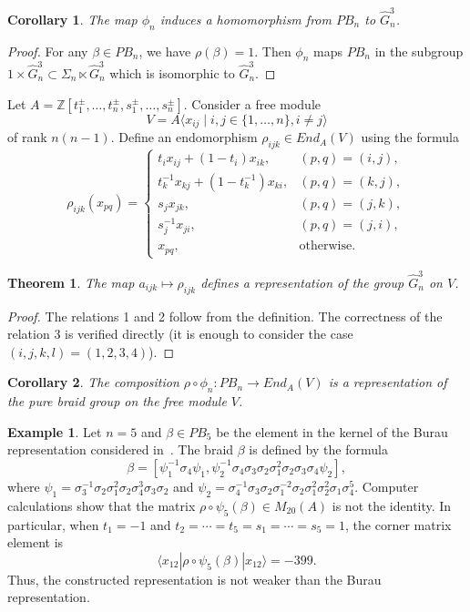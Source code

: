 \documentclass{article}
\newtheorem{theorem}{Theorem}
\newtheorem{corollary}{Corollary}
\theoremstyle{definition}
\newtheorem{example}{Example}
\newcommand{\Z}{{\mathbb Z}}
\begin{document}
\begin{corollary}
    The map  $\phi_n$ induces a homomorphism from $PB_n$ to $\hat G^3_n$.
\end{corollary}
\begin{proof}
 For any $\beta\in PB_n$, we have $\rho(\beta)=1$. Then $\phi_n$ maps $PB_n$ in the subgroup $1\times \hat G^3_n\subset \Sigma_n\ltimes \hat G^3_n$ which is isomorphic to $\hat G^3_n$.
\end{proof}

Let $A=\Z[t_1^\pm,\dots,t_n^\pm,s_1^\pm,\dots,s_n^\pm]$. Consider a free module 
\[
V=A\langle x_{ij}\mid i,j\in\{1,\dots,n\}, i\ne j\rangle
\]
of rank $n(n-1)$. Define an endomorphism $\rho_{ijk}\in End_A(V)$ using the formula
\[
\rho_{ijk}(x_{pq})=\left\{\begin{array}{cl}
    t_ix_{ij}+(1-t_i)x_{ik}, & (p,q)=(i,j), \\
    t_k^{-1}x_{kj}+(1-t_k^{-1})x_{ki}, & (p,q)=(k,j), \\
    s_j x_{jk}, & (p,q)=(j,k),\\
    s_j^{-1} x_{ji}, & (p,q)=(j,i),\\
    x_{pq}, & \mbox{otherwise}.
\end{array}\right.
\]

\begin{theorem}
    The map $a_{ijk}\mapsto \rho_{ijk}$ defines a representation of the group $\hat G^3_n$ on $V$.
\end{theorem}
\begin{proof}
    The relations 1 and 2 follow from the definition. The correctness of the relation 3 is verified directly (it is enough to consider the case $(i,j,k,l)=(1,2,3,4)$).
\end{proof}

\begin{corollary}
    The composition $\rho\circ\phi_n\colon PB_n\to End_A(V)$ is a representation of the pure braid group on the free module $V$.
\end{corollary}

\begin{example}
Let $n=5$ and $\beta\in PB_5$ be the element in the kernel of the Burau representation considered in~\cite{Big}. The braid $\beta$ is defined by the formula 
\[
\beta = [\psi_1^{-1}\sigma_4\psi_1,\psi_2^{-1}\sigma_4\sigma_3\sigma_2\sigma_1^2\sigma_2\sigma_3\sigma_4\psi_2],
\]
where $\psi_1=\sigma_3^{-1}\sigma_2\sigma_1^2\sigma_2\sigma_4^3\sigma_3\sigma_2$ and $\psi_2=\sigma_4^{-1}\sigma_3\sigma_2\sigma_1^{-2}\sigma_2\sigma_1^2\sigma_2^2\sigma_1\sigma_4^5$. Computer calculations show that the matrix $\rho\circ\psi_5(\beta)\in M_{20}(A)$ is not the identity. In particular, when $t_1=-1$ and $t_2=\cdots=t_5=s_1=\cdots=s_5=1$, the corner matrix element is
\[
\langle x_{12}|\rho\circ\psi_5(\beta)|x_{12}\rangle=-399.
\]
Thus, the constructed representation is not weaker than the Burau representation.
\end{example}
\end{document}
